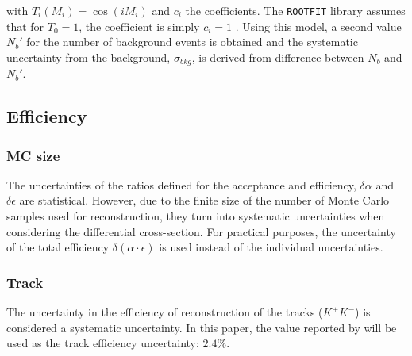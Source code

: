 with \cite{mason2002chebyshev} $T_i(M_i) = \cos(iM_i)$ and $c_i$ the coefficients. The \verb|ROOTFIT| library assumes that for $T_0 = 1$, the coefficient is simply $c_i = 1$ \cite{chebyshev}. Using this model, a second value $N_b'$ for the number of background events is obtained and the systematic uncertainty from the background, $\sigma_{bkg}$, is derived from difference between $N_b$ and $N_b'$.
\subsection{Efficiency}

\subsubsection{MC size}
The uncertainties of the ratios defined for the acceptance and efficiency, $\delta \alpha$ and $\delta \epsilon$ are statistical. However, due to the finite size of the number of Monte Carlo samples used for reconstruction, they turn into systematic uncertainties when considering the differential cross-section. For practical purposes, the uncertainty of the total efficiency $\delta(\alpha \cdot \epsilon)$ is used instead of the individual uncertainties.
\subsubsection{Track}

The uncertainty in the efficiency of reconstruction of the tracks ($K^{+}K^{-}$) is considered a systematic uncertainty. In this paper, the value reported by \cite{cms2018tracking} will be used as the track efficiency uncertainty: $2.4\%$.